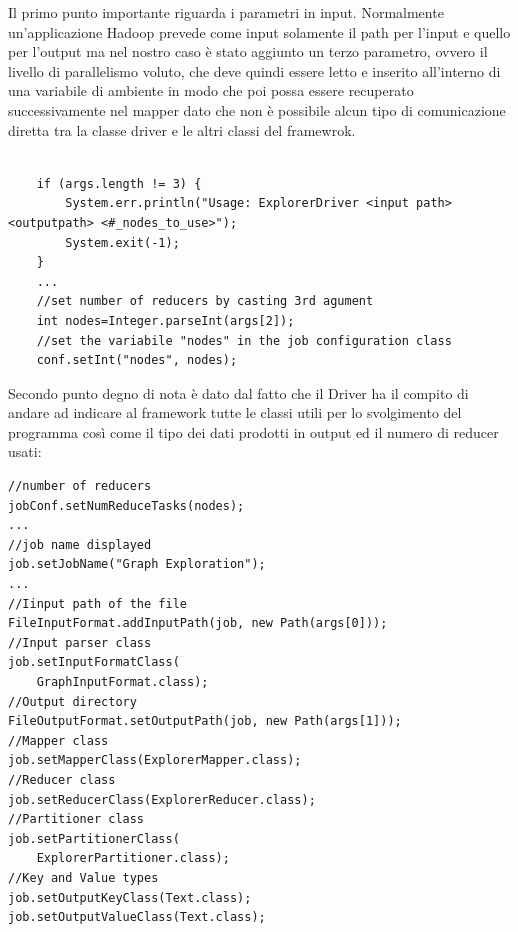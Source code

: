 \documentclass[]{IEEEtran}
\begin{document}
Il primo punto importante riguarda i parametri in input. Normalmente un'applicazione Hadoop prevede come input solamente il path per l'input e quello per l'output ma nel nostro caso è stato aggiunto un terzo parametro, ovvero il livello di parallelismo voluto, che deve quindi essere letto e inserito all'interno di una variabile di ambiente in modo che poi possa essere recuperato successivamente nel mapper dato che non è possibile alcun tipo di comunicazione diretta tra la classe driver e le altri classi del framewrok.
\begin{lstlisting}[style=javaStyle]

	if (args.length != 3) {
		System.err.println("Usage: ExplorerDriver <input path> <outputpath> <#_nodes_to_use>");
		System.exit(-1);
	}
	...
	//set number of reducers by casting 3rd agument
	int nodes=Integer.parseInt(args[2]);
	//set the variabile "nodes" in the job configuration class
	conf.setInt("nodes", nodes);
\end{lstlisting}

Secondo punto degno di nota è dato dal fatto che il Driver ha il compito di andare ad indicare al framework tutte le classi utili per lo svolgimento del programma così come il tipo dei dati prodotti in output ed il numero di reducer usati:
\begin{lstlisting}[style=javaStyle]
//number of reducers
jobConf.setNumReduceTasks(nodes); 
...
//job name displayed
job.setJobName("Graph Exploration"); 
...
//Iinput path of the file
FileInputFormat.addInputPath(job, new Path(args[0])); 
//Input parser class
job.setInputFormatClass(
	GraphInputFormat.class); 
//Output directory
FileOutputFormat.setOutputPath(job, new Path(args[1]));
//Mapper class
job.setMapperClass(ExplorerMapper.class);	
//Reducer class
job.setReducerClass(ExplorerReducer.class); 
//Partitioner class
job.setPartitionerClass(
	ExplorerPartitioner.class); 
//Key and Value types
job.setOutputKeyClass(Text.class); 
job.setOutputValueClass(Text.class);
\end{lstlisting}
\end{document}
